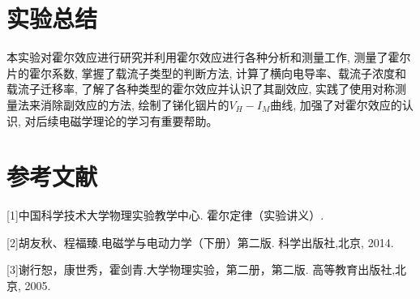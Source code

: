 \documentclass[a4paper]{article}
\begin{document}
    \hspace{6cm}{图7:$V_H-I_M$}

    \section{实验总结}

    {
        本实验对霍尔效应进行研究并利用霍尔效应进行各种分析和测量工作,
        测量了霍尔片的霍尔系数,
        掌握了载流子类型的判断方法,
        计算了横向电导率、载流子浓度和载流子迁移率,
        了解了各种类型的霍尔效应并认识了其副效应,
        实践了使用对称测量法来消除副效应的方法,
        绘制了锑化铟片的$V_H - I_M$曲线,
        加强了对霍尔效应的认识,
        对后续电磁学理论的学习有重要帮助。
    }\label{sec:1}

    \section{参考文献}

    {[1]中国科学技术大学物理实验教学中心. 霍尔定律（实验讲义）.}

    {[2]胡友秋、程福臻.电磁学与电动力学（下册）第二版.
    科学出版社,北京, 2014.}

    {[3]谢行恕，康世秀，霍剑青.大学物理实验，第二册，第二版.
    高等教育出版社,北京, 2005.}\label{sec:}
\end{document}
